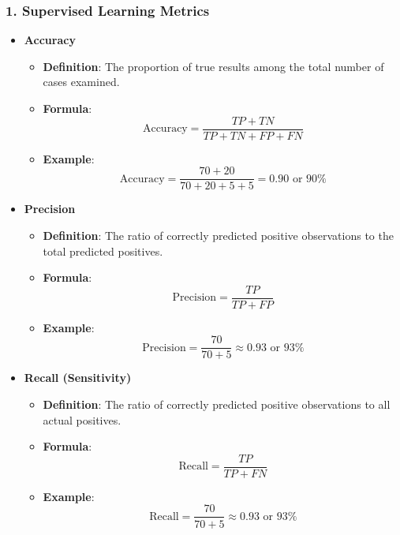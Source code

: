 \documentclass[aspectratio=169]{beamer}
\begin{document}
\begin{frame}[fragile]
    \frametitle{1. Supervised Learning Metrics}
    
    \begin{itemize}
        \item \textbf{Accuracy}
            \begin{itemize}
                \item \textbf{Definition}: The proportion of true results among the total number of cases examined.
                \item \textbf{Formula}:
                \begin{equation}
                \text{Accuracy} = \frac{TP + TN}{TP + TN + FP + FN}
                \end{equation}
                \item \textbf{Example}:
                \begin{equation}
                \text{Accuracy} = \frac{70 + 20}{70 + 20 + 5 + 5} = 0.90 \text{ or } 90\%
                \end{equation}
            \end{itemize}
        
        \item \textbf{Precision}
            \begin{itemize}
                \item \textbf{Definition}: The ratio of correctly predicted positive observations to the total predicted positives.
                \item \textbf{Formula}:
                \begin{equation}
                \text{Precision} = \frac{TP}{TP + FP}
                \end{equation}
                \item \textbf{Example}:
                \begin{equation}
                \text{Precision} = \frac{70}{70 + 5} \approx 0.93 \text{ or } 93\%
                \end{equation}
            \end{itemize}
            
        \item \textbf{Recall (Sensitivity)}
            \begin{itemize}
                \item \textbf{Definition}: The ratio of correctly predicted positive observations to all actual positives.
                \item \textbf{Formula}:
                \begin{equation}
                \text{Recall} = \frac{TP}{TP + FN}
                \end{equation}
                \item \textbf{Example}:
                \begin{equation}
                \text{Recall} = \frac{70}{70 + 5} \approx 0.93  \text{ or } 93\%
                \end{equation}
            \end{itemize}
            

\end{itemize}
\end{frame}
\end{document}
